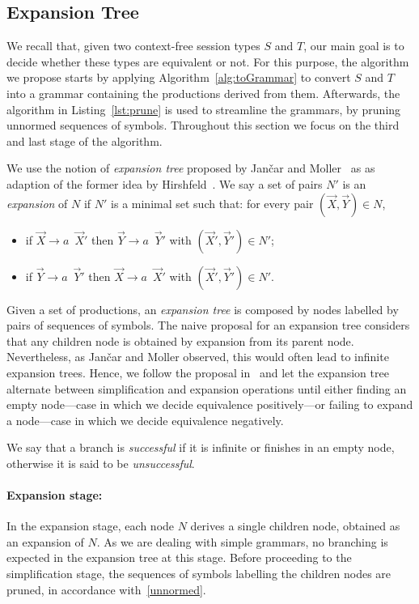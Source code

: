 
\subsection{Expansion Tree}
\label{subsec:expand}

We recall that, given two context-free session types $S$ and $T$, our main goal 
is to decide whether these types are equivalent or not. For this purpose, 
the algorithm we propose starts by applying Algorithm~\ref{alg:toGrammar} 
to convert $S$ and $T$ into a grammar containing the productions derived 
from them. Afterwards, the algorithm in Listing~\ref{lst:prune} is used to 
streamline the grammars, by pruning unnormed sequences of symbols.
Throughout this section we focus on the third and last stage of the algorithm.

We use the notion of \emph{expansion tree} proposed by Jan{\v{c}}ar 
and Moller~\cite{janvcar1999techniques} as as adaption of the former idea by 
Hirshfeld~\cite{hirshfeld1996bisimulation}. We say a set of pairs $N'$ is an 
\emph{expansion} of $N$ if $N'$ is a minimal set such that: for every pair 
$(\vec X, \vec Y) \in N$,
\begin{itemize}
	\item if $\vec X \rightarrow a \enspace\vec X'$ then $\vec Y \rightarrow 
		  a \enspace\vec Y'$ with $(\vec X',\vec Y')\in N'$;
	\item if $\vec Y \rightarrow a \enspace\vec Y'$ then $\vec X \rightarrow 
	      a \enspace\vec X'$ with $(\vec X',\vec Y')\in N'$.
\end{itemize}

Given a set of productions, an \emph{expansion tree} is composed by nodes 
labelled by pairs of sequences of symbols. The naive proposal for an
expansion tree considers that any children node is obtained by expansion 
from its parent node. Nevertheless, as Jan{\v{c}}ar and Moller 
observed, this would often lead to infinite expansion trees. Hence,
we follow the proposal in~\cite{janvcar1999techniques} and let the 
expansion tree alternate between simplification and expansion operations
until either finding an empty node---case in which we
decide equivalence positively---or failing to expand a node---case in
which we decide equivalence negatively.

We say that a branch
is \emph{successful} if it is infinite or finishes in an empty node, 
otherwise it is said to be \emph{unsuccessful}.

\paragraph{Expansion stage:}
In the expansion stage, each node $N$ derives a single children node, 
obtained as an expansion of $N$. As we are dealing with simple grammars, 
no branching is expected in the expansion tree at this stage.
Before proceeding to the simplification stage, the sequences of symbols 
labelling the children nodes are pruned, in accordance with~\eqref{unnormed}.

